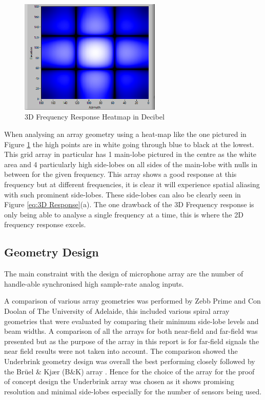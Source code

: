 \documentclass{UoNMCHA}
\numberwithin{equation}{section}
\begin{document}
    \begin{figure}[H]
        \centering
        \includegraphics[keepaspectratio, width = 0.6\textwidth]{Figures/3DHeatFigure.png}
        \caption{3D Frequency Response Heatmap in Decibel}
        \label{fig:3D Heatmap}
    \end{figure}
    
    When analysing an array geometry using a heat-map like the one pictured in Figure \ref{fig:3D Heatmap} the high points are in white going through blue to black at the lowest. This grid array in particular has 1 main-lobe pictured in the centre as the white area and 4 particularly high side-lobes on all sides of the main-lobe with nulls in between for the given frequency. This array shows a good response at this frequency but at different frequencies, it is clear it will experience spatial aliasing with such prominent side-lobes. These side-lobes can also be clearly seen in Figure \ref{eq:3D Response}(a). The one drawback of the 3D Frequency response is only being able to analyse a single frequency at a time, this is where the 2D frequency response excels.

\subsection{Geometry Design} \label{sec:Array Geometry}

    The main constraint with the design of microphone array are the number of handle-able synchronised high sample-rate analog inputs.
    
    A comparison of various array geometries was performed by Zebb Prime and Con Doolan of The University of Adelaide, this included various spiral array geometries that were evaluated by comparing their minimum side-lobe levels and beam widths. A comparison of all the arrays for both near-field and far-field was presented but as the purpose of the array in this report is for far-field signals the near field results were not taken into account. The comparison showed the Underbrink geometry design was overall the best performing closely followed by the Brüel \& Kjær (B\&K) array \citep{Pri13}. Hence for the choice of the array for the proof of concept design the Underbrink array was chosen as it shows promising resolution and minimal side-lobes especially for the number of sensors being used.
    
\end{document}
